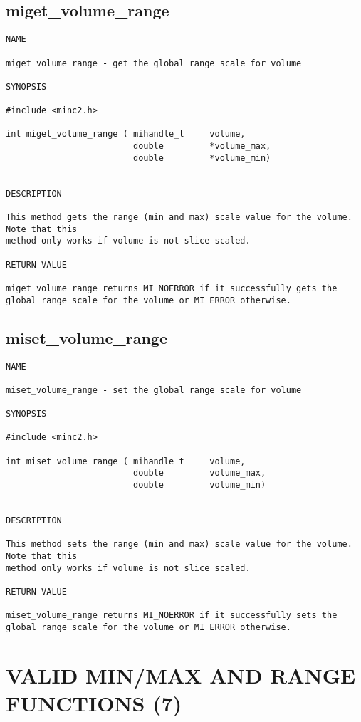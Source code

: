 \documentclass{article}
\begin{document}
\subsection{miget\_volume\_range}
\begin{verbatim}
NAME

miget_volume_range - get the global range scale for volume

SYNOPSIS

#include <minc2.h>

int miget_volume_range ( mihandle_t     volume,
                         double         *volume_max,
                         double         *volume_min)


DESCRIPTION

This method gets the range (min and max) scale value for the volume. Note that this 
method only works if volume is not slice scaled.

RETURN VALUE

miget_volume_range returns MI_NOERROR if it successfully gets the
global range scale for the volume or MI_ERROR otherwise. 
\end{verbatim}

\subsection{miset\_volume\_range}
\begin{verbatim}
NAME

miset_volume_range - set the global range scale for volume

SYNOPSIS

#include <minc2.h>

int miset_volume_range ( mihandle_t     volume,
                         double         volume_max,
                         double         volume_min)


DESCRIPTION

This method sets the range (min and max) scale value for the volume. Note that this 
method only works if volume is not slice scaled.

RETURN VALUE

miset_volume_range returns MI_NOERROR if it successfully sets the
global range scale for the volume or MI_ERROR otherwise.
\end{verbatim}

\section{VALID MIN/MAX AND RANGE FUNCTIONS (7)}
\end{document}
